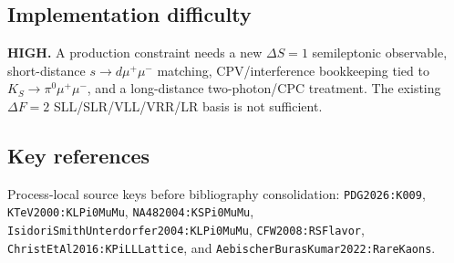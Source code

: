 \subsection*{Implementation difficulty}
\textbf{HIGH.}  A production constraint needs a new \(\Delta S=1\) semileptonic
observable, short-distance \(s\to d\mu^+\mu^-\) matching, CPV/interference
bookkeeping tied to \(K_S\to\pi^0\mu^+\mu^-\), and a long-distance
two-photon/CPC treatment.  The existing \(\Delta F=2\) SLL/SLR/VLL/VRR/LR
basis is not sufficient.

\subsection*{Key references}
Process-local source keys before bibliography consolidation:
\texttt{PDG2026:K009}, \texttt{KTeV2000:KLPi0MuMu},
\texttt{NA482004:KSPi0MuMu},
\texttt{IsidoriSmithUnterdorfer2004:KLPi0MuMu},
\texttt{CFW2008:RSFlavor}, \texttt{ChristEtAl2016:KPiLLLattice}, and
\texttt{AebischerBurasKumar2022:RareKaons}.
